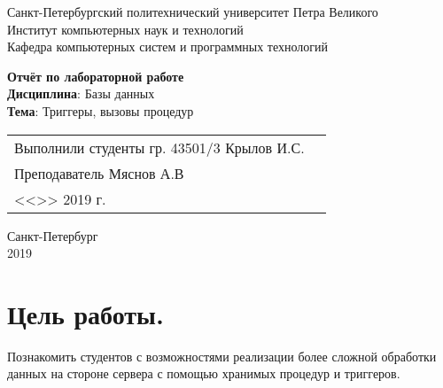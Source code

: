 \documentclass[a4paper,14pt]{extarticle}
\begin{document}
\begin{titlepage}
\centering
Санкт-Петербургский политехнический университет Петра Великого \\
Институт компьютерных наук и технологий \\
Кафедра компьютерных систем и программных технологий \\
\vspace{5.5cm}

{\centering \textbf{Отчёт по лабораторной работе} \\ 
\vspace{0.15cm}
\textbf{Дисциплина}: Базы данных \\
\vspace{0.15cm}
\textbf{Тема}: Триггеры, вызовы процедур} \\

\vspace{5.5cm}

\begin{table}[H]
\begin{tabular}{p{\textwidth}@{}r}
{Выполнили студенты гр. 43501/3} \hfill 
\vspace{0.2cm}
Крылов И.С. \\ \hfill
\vspace{0.2cm}

Преподаватель \hfill 
\vspace{0.2cm}
Мяснов А.В \\ \hfill 
\vspace{0.2cm}

{} \hfill { <<\underline{\hspace{0.08\textwidth}}>> \underline{\hspace{0.2\textwidth}}2019 г.} \\
\end{tabular}
\end{table}
\vfill
{\centering Санкт-Петербург \\ 
\vspace{0.15cm}
2019}
\end{titlepage}

\section{Цель работы.}
Познакомить студентов с возможностями реализации более сложной обработки
данных на стороне сервера с помощью хранимых процедур и триггеров.
\end{document}
